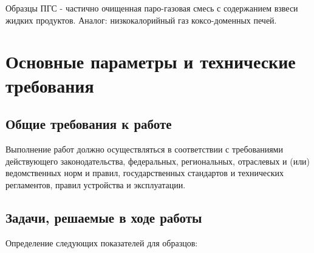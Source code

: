 \documentclass[russian,utf8]{eskdtext}
\begin{document}
Образцы ПГС - частично очищенная паро-газовая смесь с содержанием взвеси жидких продуктов. Аналог: низкокалорийный газ коксо-доменных печей.

\section{Основные параметры и технические требования}
\subsection{Общие требования к работе}
Выполнение работ должно осуществляться в соответствии с требованиями действующего законодательства, федеральных, региональных, отраслевых и (или) ведомственных норм и правил, государственных стандартов и технических регламентов, правил устройства и эксплуатации.
\subsection{Задачи, решаемые в ходе работы}
Определение следующих показателей для образцов:
\end{document}
